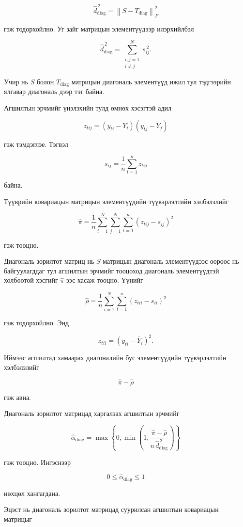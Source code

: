 \[
\widehat{d}_{\mathrm{diag}}^{\,2}
=
\left\|
S-T_{\mathrm{diag}}
\right\|_F^2
\]

гэж тодорхойлно. Уг зайг матрицын элементүүдээр
илэрхийлбэл

\[
\widehat{d}_{\mathrm{diag}}^{\,2}
=
\sum_{\substack{i,j=1\\i\neq j}}^{N}s_{ij}^{\,2}.
\]

Учир нь $S$ болон $T_{\mathrm{diag}}$ матрицын диагональ
элементүүд ижил тул тэдгээрийн ялгавар диагональ дээр тэг
байна.

Агшилтын эрчмийг үнэлэхийн тулд өмнөх хэсэгтэй адил

\[
z_{tij}
=
(y_{ti}-\overline{Y}_i)
(y_{tj}-\overline{Y}_j)
\]

гэж тэмдэглэе. Тэгвэл

\[
s_{ij}
=
\frac{1}{n}
\sum_{t=1}^{n}z_{tij}
\]

байна.

Түүврийн ковариацын матрицын элементүүдийн түүвэрлэлтийн
хэлбэлзлийг

\[
\widehat{\pi}
=
\frac{1}{n}
\sum_{i=1}^{N}
\sum_{j=1}^{N}
\sum_{t=1}^{n}
(z_{tij}-s_{ij})^2
\]

гэж тооцно.

Диагональ зорилтот матриц нь $S$ матрицын диагональ
элементүүдээс өөрөөс нь байгуулагддаг тул агшилтын эрчмийг
тооцоход диагональ элементүүдтэй холбоотой хэсгийг
$\widehat{\pi}$-ээс хасаж тооцно. Үүнийг

\[
\widehat{\rho}
=
\frac{1}{n}
\sum_{i=1}^{N}
\sum_{t=1}^{n}
(z_{tii}-s_{ii})^2
\]

гэж тодорхойлно. Энд

\[
z_{tii}
=
(y_{ti}-\overline{Y}_i)^2.
\]

Иймээс агшилтад хамаарах диагоналийн бус элементүүдийн
түүвэрлэлтийн хэлбэлзлийг

\[
\widehat{\pi}-\widehat{\rho}
\]

гэж авна.

Диагональ зорилтот матрицад харгалзах агшилтын эрчмийг

\[
\widehat{\alpha}_{\mathrm{diag}}
=
\max
\left\{
0,
\min
\left(
1,
\frac{\widehat{\pi}-\widehat{\rho}}
{n\,\widehat{d}_{\mathrm{diag}}^{\,2}}
\right)
\right\}
\]

гэж тооцно. Ингэснээр

\[
0
\leq
\widehat{\alpha}_{\mathrm{diag}}
\leq
1
\]

нөхцөл хангагдана.

Эцэст нь диагональ зорилтот матрицад суурилсан агшилтын
ковариацын матрицыг

